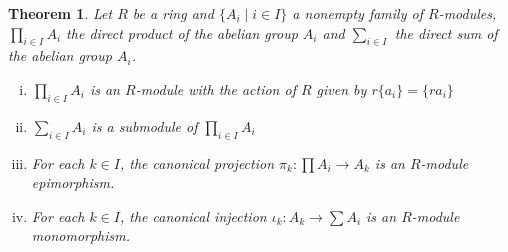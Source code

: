 \documentclass[a4paper]{article}
\newtheorem{myTheo}{Theorem}
\begin{document}
    \vspace{0.5cm}
    \begin{myTheo}
        Let $R$ be a ring and $\{A_i\;|\;i\in I\}$ a nonempty family of $R$-modules,$\prod_{i\in I}A_i$ the direct product of the abelian group
        $A_i$ and $\sum_{i\in I}$ the direct sum of the abelian group $A_i$.
        \begin{enumerate}[(i)]
            \item $\prod_{i\in I}A_i$ is an $R$-module with the action of $R$ given by $r\{a_i\}=\{ra_i\}$
            \item $\sum_{i\in I}A_i$ is a submodule of $\prod_{i\in I}A_i$
            \item For each $k\in I$, the canonical projection $\pi_k:\prod A_i\rightarrow A_k$ is an $R$-module epimorphism.
            \item For each $k\in I$, the canonical injection $\iota_k:A_k\rightarrow \sum A_i$ is an $R$-module monomorphism.
        \end{enumerate}
    \end{myTheo}
\end{document}
